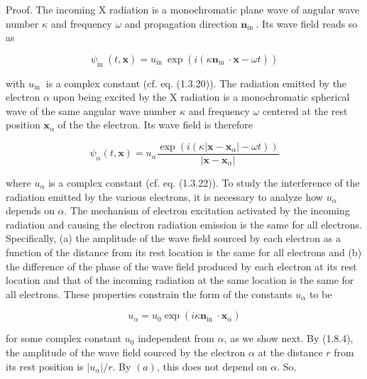\documentclass{article}
\begin{document}
Proof. The incoming X radiation is a monochromatic plane wave of angular wave number $\kappa$ and frequency $\omega$ and propagation direction $\boldsymbol{n}_{\text {in }}$. Its wave field reads so as
 
\begin{equation*}
\psi_{\text {in }}(t, \boldsymbol{x})=u_{\text {in }} \exp \left(i\left(\kappa \boldsymbol{n}_{\text {in }} \cdot \boldsymbol{x}-\omega t\right)\right) \tag{1.8.3}
\end{equation*}
 
with $u_{\text {in }}$ is a complex constant (cf. eq. (1.3.20)). The radiation emitted by the electron $\alpha$ upon being excited by the X radiation is a monochromatic spherical wave of the same angular wave number $\kappa$ and frequency $\omega$ centered at the rest position $\boldsymbol{x}_{\alpha}$ of the the electron. Its wave field is therefore
 
\begin{equation*}
\psi_{\alpha}(t, \boldsymbol{x})=u_{\alpha} \frac{\exp \left(i\left(\kappa\left|\boldsymbol{x}-\boldsymbol{x}_{\alpha}\right|-\omega t\right)\right)}{\left|\boldsymbol{x}-\boldsymbol{x}_{\alpha}\right|} \tag{1.8.4}
\end{equation*}
 
where $u_{\alpha}$ is a complex constant (cf. eq. (1.3.22)). To study the interference of the radiation emitted by the various electrons, it is necessary to analyze how $u_{\alpha}$ depends on $\alpha$. The mechanism of electron excitation activated by the incoming radiation and causing the electron radiation emission is the same for all electrons. Specifically, (a) the amplitude of the wave field sourced by each electron as a function of the distance
from its rest location is the same for all electrons and (b) the difference of the phase of the wave field produced by each electron at its rest location and that of the incoming radiation at the same location is the same for all electrons. These properties constrain the form of the constants $u_{\alpha}$ to be
 
\begin{equation*}
u_{\alpha}=u_{0} \exp \left(i \kappa \boldsymbol{n}_{\text {in }} \cdot \boldsymbol{x}_{\alpha}\right) \tag{1.8.5}
\end{equation*}
 
for some complex constant $u_{0}$ independent from $\alpha$, as we show next.
By (1.8.4), the amplitude of the wave field sourced by the electron $\alpha$ at the distance $r$ from its rest position is $\left|u_{\alpha}\right| / r$. By $(a)$, this does not depend on $\alpha$. So,
 
\end{document}
